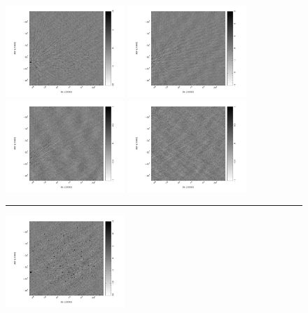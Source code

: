 \begin{figure}[h!]
\centering
\includegraphics[width=0.4\textwidth]{chapters/eor_window_PAPER/figures/zen_2455819_50285_orig-I-image.pdf}
\includegraphics[width=0.4\textwidth]{chapters/eor_window_PAPER/figures/zen_2455819_50285_orig-Q-image.pdf}
\includegraphics[width=0.4\textwidth]{chapters/eor_window_PAPER/figures/zen_2455819_50285_orig-U-image.pdf}
\includegraphics[width=0.4\textwidth]{chapters/eor_window_PAPER/figures/zen_2455819_50285_orig-V-image.pdf}
\noindent\rule{14cm}{0.6pt}
\includegraphics[width=0.4\textwidth]{chapters/eor_window_PAPER/figures/zen_2455819_50285-I-image.pdf}

\end{figure}
